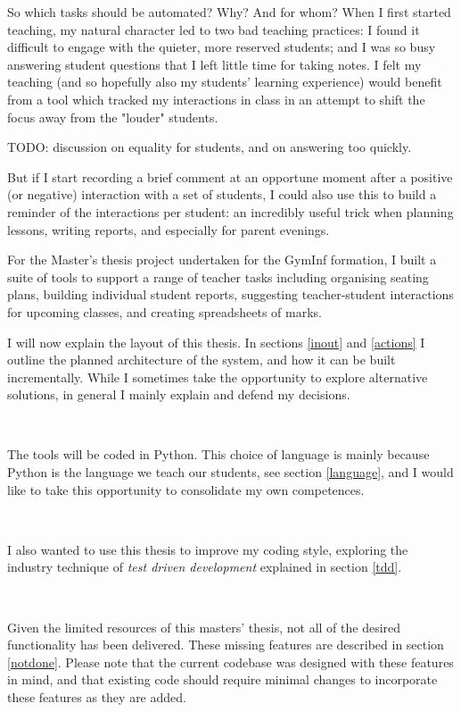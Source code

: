 \documentclass[10pt]{article}
\begin{document}
So which tasks should be automated? Why? And for whom? When I first started teaching, my natural character led to two bad teaching practices: I found it difficult to engage with the quieter, more reserved students; and I was so busy answering student questions that I left little time for taking notes. I felt my teaching (and so hopefully also my students' learning experience) would benefit from a tool which tracked my interactions in class in an attempt to shift the focus away from the "louder" students. 

TODO: discussion on equality for students, and \cite{Hat12} on answering too quickly.

But if I start recording a brief comment at an opportune moment after a positive (or negative) interaction with a set of students, I could also use this to build a reminder of the interactions per student: an incredibly useful trick when planning lessons, writing reports, and especially for parent evenings.

For the Master's thesis project undertaken for the GymInf formation, I built a suite of tools to support a range of teacher tasks including organising seating plans, building individual student reports, suggesting teacher-student interactions for upcoming classes, and creating spreadsheets of marks. 


I will now explain the layout of this thesis. In sections \ref{inout} and \ref{actions} I outline the planned architecture of the system, and how it can be built incrementally. While I sometimes take the opportunity to explore alternative solutions, in general I mainly explain and defend my decisions.

\

The tools will be coded in Python. This choice of language is mainly because Python is the language we teach our students, see section \ref{language}, and I would like to take this opportunity to consolidate my own competences.

\

I also wanted to use this thesis to improve my coding style, exploring the industry technique of \emph{test driven development} explained in section \ref{tdd}.

\


Given the limited resources of this masters' thesis, not all of the desired functionality has been delivered. These missing features are described in section \ref{notdone}. Please note that the current codebase was designed with these features in mind, and that existing code should require minimal changes to incorporate these features as they are added.
\end{document}
